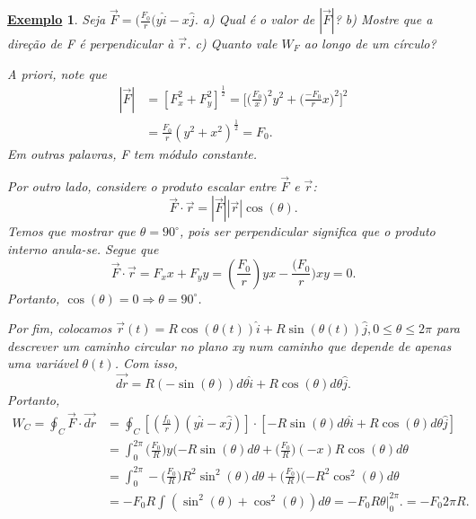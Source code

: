 \documentclass{article}
\newtheorem{example}{\underline{Exemplo}}
\begin{document}
   \begin{example}
      Seja \(\vec{F} = (\frac{F_{0}}{r}(y\hat{i}-x\hat{j}\). a) Qual é o valor de \(|\vec{F}|\)? b) Mostre que a dire\c cão de F é perpendicular à \(\vec{r}\).
      c) Quanto vale \(W_{F}\) ao longo de um círculo?

      A priori, note que 
     \begin{align*}
       |\vec{F}| &= [F_{x}^{2} + F_{y}^{2}]^{\frac{1}{2}} = \biggl[\biggl(\frac{F_{0}}{x}\biggr)^{2}y^{2} + \biggl(\frac{-F_{0}}{r}x\biggr)^{2}\biggr]^{2}\\
                 &= \frac{F_{0}}{r}(y^{2}+x^{2})^{\frac{1}{2}} = F_{0}.
     \end{align*}
     Em outras palavras, F tem módulo constante.

     Por outro lado, considere o produto escalar entre \(\vec{F}\) e \(\vec{r}\): 
       \[
         \vec{F}\cdot \vec{r} = |\vec{F}||\vec{r}|\cos{(\theta )}.
       \]
      Temos que mostrar que \(\theta = 90^{\circ}\), pois ser perpendicular significa que o produto interno anula-se. Segue que 
        \[
          \vec{F}\cdot \vec{r} = F_{x}x + F_{y}y = (\frac{F_{0}}{r})yx - \frac{(F_{0}}{r})xy = 0.
        \]
      Portanto, \(\cos{(\theta )} = 0 \Rightarrow \theta =90^{\circ}\).

      Por fim, colocamos \(\vec{r}(t) = R\cos{(\theta (t))}\hat{i} + R\sin{(\theta (t))}\hat{j}, 0\leq \theta \leq 2\pi \) para descrever um caminho circular 
      no plano xy num caminho que depende de apenas uma variável \(\theta (t)\). Com isso,
      \[
        \vec{dr} = R(-\sin{(\theta )})d\theta \hat{i} + R\cos{(\theta )}d\theta \hat{j}.
      \]
      Portanto, 
     \begin{align*}
       W_{C} = \oint_{C}\vec{F}\cdot \vec{dr} &= \oint_{C}[(\frac{f_{0}}{r})(y\hat{i}-x\hat{j})]\cdot [-R\sin{(\theta )}d\theta \hat{i} + R\cos{(\theta )}d\theta \hat{j}] \\
                                              &= \int_{0}^{2\pi }\biggl(\frac{F_{0}}{R}\biggr)y(-R\sin{(\theta )d\theta } + \biggl(\frac{F_{0}}{R}\biggr)(-x)R\cos{(\theta )}d\theta \\
                                              &= \int_{0}^{2\pi }-\biggl(\frac{F_{0}}{R}\biggr)R^{2}\sin^{2}{(\theta )}d\theta  + \biggl(\frac{F_{0}}{R}\biggr)(-R^{2}\cos^{2}{(\theta )}d\theta \\
                                              &= -F_{0}R \int_{}^{}(\sin^{2}{(\theta )} + \cos^{2}{(\theta )})d\theta  = -F_{0}R\theta \biggl|_{0}^{2\pi }\biggr. = -F_{0}2\pi R.
     \end{align*}
   \end{example}
\end{document}
